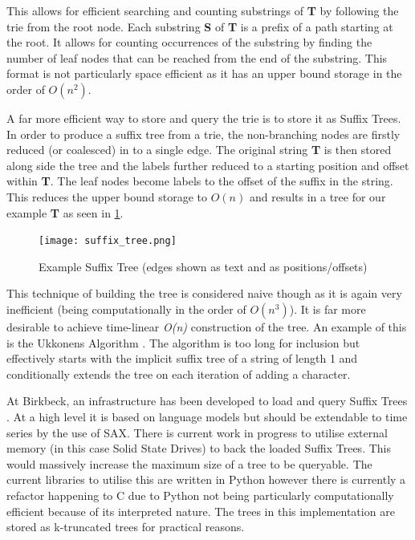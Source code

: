\documentclass[11pt, a4paper]{scrartcl}
\begin{document}
	This allows for efficient searching and counting substrings of \textbf{T} by following the trie from the root node.  Each substring \textbf{S} of \textbf{T} is a prefix of a path starting at the root.  It allows for counting occurrences of the substring by finding the number of leaf nodes that can be reached from the end of the substring.  This format is not particularly space efficient as it has an upper bound storage in the order of \textit{$O(n^{2})$}.
	
	A far more efficient way to store and query the trie is to store it as Suffix Trees.  In order to produce a suffix tree from a trie, the non-branching nodes are firstly reduced (or coalesced) in to a single edge.  The original string \textbf{T} is then stored along side the tree and the labels further reduced to a starting position and offset within \textbf{T}.  The leaf nodes become labels to the offset of the suffix in the string.  This reduces the upper bound storage to \textit{$O(n)$} and results in a tree for our example \textbf{T} as seen in \cref{fig:tree}.
	\begin{figure}[h]
		\label{fig:tree}
		\centering
		\texttt{[image: suffix\_tree.png]}
		\caption{Example Suffix Tree (edges shown as text and as positions/offsets)}
	\end{figure}
	
	This technique of building the tree is considered naive though as it is again very inefficient (being computationally in the order of \textit{$O(n^{3})$}).  It is far more desirable to achieve time-linear \textit{O(n)} construction of the tree.  An example of this is the Ukkonens Algorithm \citep{ukkonens}.  The algorithm is too long for inclusion but effectively starts with the implicit suffix tree of a string of length 1 and conditionally extends the tree on each iteration of adding a character.
	
	At Birkbeck, an infrastructure has been developed to load and query Suffix Trees \citep{bbk-suffix}.  At a high level it is based on language models but should be extendable to time series by the use of SAX.  There is current work in progress to utilise external memory (in this case Solid State Drives) to back the loaded Suffix Trees.  This would massively increase the maximum size of a tree to be queryable.  The current libraries to utilise this are written in Python however there is currently a refactor happening to C due to Python not being particularly computationally efficient because of its interpreted nature.  The trees in this implementation are stored as k-truncated trees for practical reasons.
	
\end{document}
